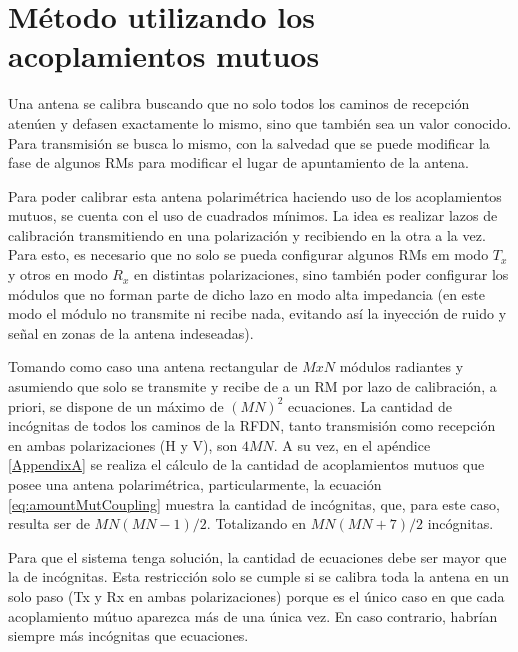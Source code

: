 \chapter{Método utilizando los acoplamientos mutuos}
\label{ch:estado}

Una antena se calibra buscando que no solo todos los caminos de recepción atenúen y defasen exactamente lo mismo, sino que 
también sea un valor conocido. Para transmisión se busca lo mismo, con la salvedad que se puede modificar la fase de algunos
RMs para modificar el lugar de apuntamiento de la antena.


Para poder calibrar esta antena polarimétrica haciendo uso de los acoplamientos mutuos, se cuenta con el uso de 
cuadrados mínimos. La idea es realizar lazos de calibración transmitiendo en una polarización y recibiendo en la
otra a la vez. Para esto, es necesario que no solo se pueda configurar algunos RMs em modo $T_x$ y otros en modo $R_x$ en 
distintas polarizaciones, sino también poder configurar los módulos que no forman parte de dicho lazo en modo alta 
impedancia (en este modo el módulo no transmite ni recibe nada, evitando así la inyección de ruido y señal en zonas de la 
antena indeseadas). 

Tomando como caso una antena rectangular de $M x N$ módulos radiantes y asumiendo que solo se transmite y recibe de a un 
RM por lazo de calibración, a priori, se dispone de un máximo de $(MN)^2$ ecuaciones. La cantidad de incógnitas de todos
los caminos de la RFDN, tanto transmisión como recepción en ambas polarizaciones (H y V), son $4MN$. A su vez, en el 
apéndice \ref{AppendixA} se realiza el cálculo de la cantidad de acoplamientos mutuos que posee una antena polarimétrica,
particularmente, la ecuación \ref{eq:amountMutCoupling} muestra la cantidad de incógnitas, que, para este caso, resulta 
ser de $MN(MN-1)/2$. Totalizando en $MN(MN + 7)/2$ incógnitas.

Para que el sistema tenga solución, la cantidad de ecuaciones debe ser mayor que la de incógnitas. Esta restricción solo 
se cumple si se calibra toda la antena en un solo paso (Tx y Rx en ambas polarizaciones) porque es el único caso en que 
cada acoplamiento mútuo aparezca más de una única vez. En caso contrario, habrían siempre más incógnitas que ecuaciones.


